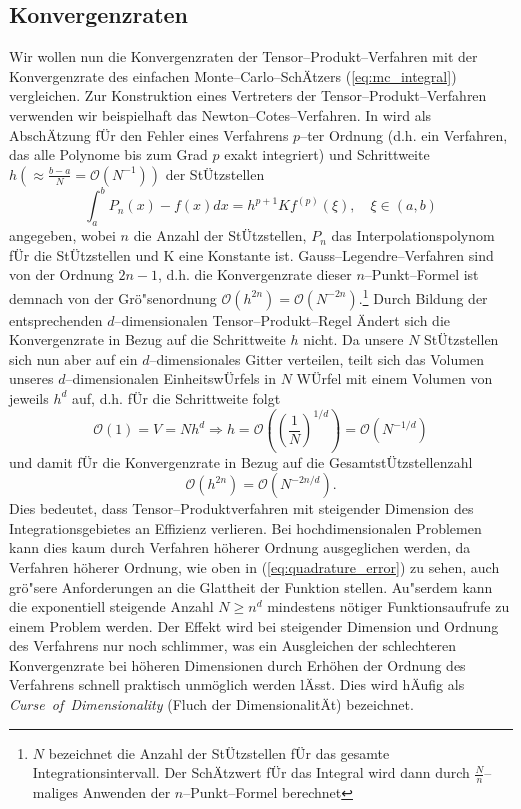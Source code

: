	\subsection{Konvergenzraten}\label{subsec:integrationsproblem_comparison}
	Wir wollen nun die Konvergenzraten der Tensor--Produkt--Verfahren mit der Konvergenzrate des einfachen Monte--Carlo--SchÄtzers (\ref{eq:mc_integral}) vergleichen. Zur Konstruktion eines Vertreters der Tensor--Produkt--Verfahren verwenden wir beispielhaft das Newton--Cotes--Verfahren. In \citep[][3.1.4]{Stoer:2005p10586} wird als Ab\-schÄt\-zung fÜr den Fehler eines Verfahrens $p$--ter Ordnung (d.h. ein Verfahren, das alle Polynome bis zum Grad $p$ exakt integriert) und Schrittweite $h(\approx\frac{b-a}{N}=\mathcal{O}(N^{-1}))$ der StÜtzstellen
	\begin{equation}
		\int_a^b P_n(x)-f(x)dx=h^{p+1}K f^{(p)}(\xi),\quad\xi\in(a,b)
		\label{eq:quadrature_error}
	\end{equation}
	angegeben, wobei $n$ die Anzahl der StÜtzstellen, $P_n$ das Interpolationspolynom fÜr die StÜtzstellen und K eine Konstante ist. Gauss--Legendre--Verfahren sind von der Ordnung $2n-1$, d.h. die Konvergenzrate dieser $n$--Punkt--Formel ist demnach von der Grö"senordnung $\mathcal{O}(h^{2n})=\mathcal{O}(N^{-2n})$.\footnote{$N$ bezeichnet die Anzahl der StÜtzstellen fÜr das gesamte Integrationsintervall. Der SchÄtzwert fÜr das Integral wird dann durch $\frac{N}{n}$--maliges Anwenden der $n$--Punkt--Formel berechnet}
	Durch Bildung der entsprechenden $d$--dimensionalen Tensor--Produkt--Regel Ändert sich die Konvergenzrate in Bezug auf die Schrittweite $h$ nicht. Da unsere $N$ StÜtzstellen sich nun aber auf ein $d$--dimensionales Gitter verteilen, teilt sich das Volumen unseres $d$--dimensionalen EinheitswÜrfels in $N$ WÜrfel mit einem Volumen von jeweils $h^d$ auf, d.h. fÜr die Schrittweite folgt
	$$\mathcal{O}(1)=V=N h^d \Rightarrow h=\mathcal{O}\left(\left(\frac{1}{N}\right)^{1/d}\right)=\mathcal{O}\left(N^{-1/d}\right)$$	
	und damit fÜr die Konvergenzrate in Bezug auf die GesamtstÜtzstellenzahl
	$$\mathcal{O}(h^{2n})=\mathcal{O}(N^{-2n/d}).$$
	Dies bedeutet, dass Tensor--Produktverfahren mit steigender Dimension des Integrationsgebietes an Effizienz verlieren. Bei hochdimensionalen Problemen kann dies kaum durch Verfahren höherer Ordnung ausgeglichen werden, da Verfahren höherer Ordnung, wie oben in (\ref{eq:quadrature_error}) zu sehen, auch grö"sere Anforderungen an die Glattheit der Funktion stellen. Au"serdem kann die exponentiell steigende Anzahl $N \geq n^d$ mindestens nötiger Funktionsaufrufe zu einem Problem werden. Der Effekt wird bei steigender Dimension und Ordnung des Verfahrens nur noch schlimmer, was ein Ausgleichen der schlechteren Konvergenzrate bei höheren Dimensionen durch Erhöhen der Ordnung des Verfahrens schnell praktisch unmöglich werden lÄsst. Dies wird hÄufig als {\em Curse~of~Dimensionality} (Fluch der DimensionalitÄt) bezeichnet.
	
